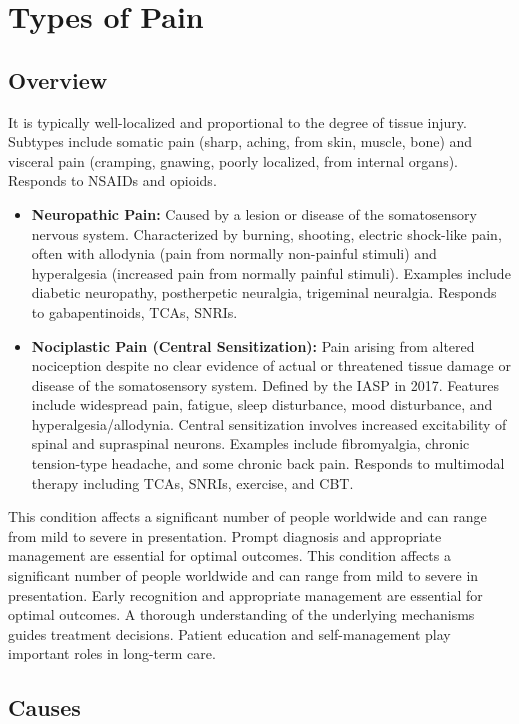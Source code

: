 \chapter{Types of Pain}
\label{sec:Types of Pain}

\section{Overview}
It is typically well-localized and proportional to the degree of tissue injury. Subtypes include somatic pain (sharp, aching, from skin, muscle, bone) and visceral pain (cramping, gnawing, poorly localized, from internal organs). Responds to NSAIDs and opioids.
\begin{itemize}[noitemsep]
  \item \textbf{Neuropathic Pain:} Caused by a lesion or disease of the somatosensory nervous system. Characterized by burning, shooting, electric shock-like pain, often with allodynia (pain from normally non-painful stimuli) and hyperalgesia (increased pain from normally painful stimuli). Examples include diabetic neuropathy, postherpetic neuralgia, trigeminal neuralgia. Responds to gabapentinoids, TCAs, SNRIs.
  \item \textbf{Nociplastic Pain (Central Sensitization):} Pain arising from altered nociception despite no clear evidence of actual or threatened tissue damage or disease of the somatosensory system. Defined by the IASP in 2017. Features include widespread pain, fatigue, sleep disturbance, mood disturbance, and hyperalgesia/allodynia. Central sensitization involves increased excitability of spinal and supraspinal neurons. Examples include fibromyalgia, chronic tension-type headache, and some chronic back pain. Responds to multimodal therapy including TCAs, SNRIs, exercise, and CBT.
\end{itemize}
This condition affects a significant number of people worldwide and can range from mild to severe in presentation. Prompt diagnosis and appropriate management are essential for optimal outcomes. This condition affects a significant number of people worldwide and can range from mild to severe in presentation. Early recognition and appropriate management are essential for optimal outcomes. A thorough understanding of the underlying mechanisms guides treatment decisions. Patient education and self-management play important roles in long-term care.
\section{Causes}
